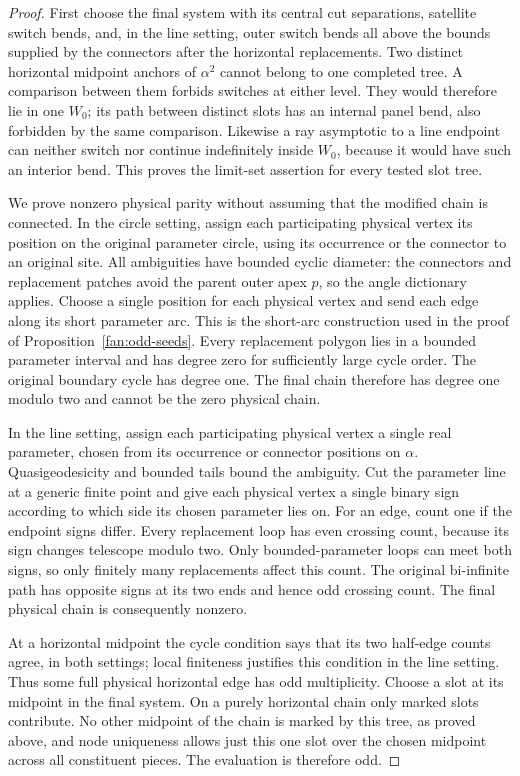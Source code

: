 \begin{proof}
First choose the final system with its central cut separations, satellite
switch bends, and, in the line setting, outer switch bends all above the
bounds supplied by the connectors after the horizontal replacements. Two
distinct horizontal midpoint anchors of $\alpha^2$ cannot belong to one
completed tree. A comparison between them forbids switches at either
level. They would therefore lie in one $W_0$; its path between distinct
slots has an internal panel bend, also forbidden by the same comparison.
Likewise a ray asymptotic to a line endpoint can neither switch nor
continue indefinitely inside $W_0$, because it would have such an
interior bend. This proves the limit-set assertion for every tested slot
tree.

We prove nonzero physical parity without assuming that the modified chain
is connected. In the circle setting, assign each participating physical
vertex its position on the original parameter circle, using its occurrence
or the connector to an original site. All ambiguities have bounded cyclic
diameter: the connectors and replacement patches avoid the parent outer
apex $p$, so the angle dictionary applies. Choose a single position for
each physical vertex and send each edge along its short parameter arc.
This is the short-arc construction used in the proof of
Proposition~\ref{fan:odd-seeds}.
Every replacement polygon lies in a bounded parameter interval and has
degree zero for sufficiently large cycle order. The original boundary
cycle has degree one. The final chain therefore has degree one modulo two
and cannot be the zero physical chain.

In the line setting, assign each participating physical vertex a single
real parameter, chosen from its occurrence or connector positions on
$\alpha$. Quasigeodesicity and bounded tails bound the ambiguity. Cut the
parameter line at a generic finite point and give each physical vertex a
single binary sign according to which side its chosen parameter lies on.
For an edge, count one if the endpoint signs differ. Every replacement
loop has even crossing count, because its sign changes telescope modulo
two. Only bounded-parameter loops can meet both signs, so only finitely
many replacements affect this count. The original bi-infinite path has
opposite signs at its two ends and hence odd crossing count. The final
physical chain is consequently nonzero.

At a horizontal midpoint the cycle condition says that its two half-edge
counts agree, in both settings; local finiteness justifies this condition
in the line setting. Thus some full physical horizontal edge has odd
multiplicity. Choose a slot at its midpoint in the final system. On a
purely horizontal chain only marked slots contribute. No other midpoint
of the chain is marked by this tree, as proved above, and node uniqueness
allows just this one slot over the chosen midpoint across all constituent
pieces. The evaluation is therefore odd.


\end{proof}
